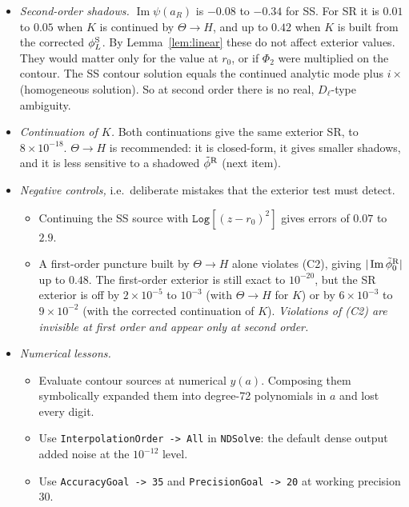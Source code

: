 \documentclass[11pt,a4paper]{article}
\renewcommand{\Im}{\operatorname{Im}}
\newcommand{\phiS}{\phi^{\rm S}}
\newcommand{\code}[1]{\texttt{#1}}
\begin{document}
\begin{itemize}[nosep]
\item \emph{Second-order shadows.}
  $\Im\psi(a_R)$ is $-0.08$ to $-0.34$ for SS.
  For SR it is $0.01$ to $0.05$ when $K$ is continued by $\Theta\to H$, and up to $0.42$ when $K$ is built from the corrected $\phiS_L$.
  By Lemma~\ref{lem:linear} these do not affect exterior values.
  They would matter only for the value at $r_0$, or if $\Phi_2$ were multiplied on the contour.
  The SS contour solution equals the continued analytic mode plus $i\times$(homogeneous solution).
  So at second order there is no real, $D_\ell$-type ambiguity.
\item \emph{Continuation of $K$.}
  Both continuations give the same exterior SR, to $8\times10^{-18}$.
  $\Theta\to H$ is recommended: it is closed-form, it gives smaller shadows, and it is less sensitive to a shadowed $\tilde\phi^{\rm R}$ (next item).
\item \emph{Negative controls,} i.e.\ deliberate mistakes that the exterior test must detect.
  \begin{itemize}[nosep]
  \item Continuing the SS source with $\code{Log}[(z-r_0)^2]$ gives errors of $0.07$ to $2.9$.
  \item A first-order puncture built by $\Theta\to H$ alone violates (C2), giving $|\Im\tilde\phi^{\rm R}_0|$ up to $0.48$.
    The first-order exterior is still exact to $10^{-20}$, but the SR exterior is off by $2\times10^{-5}$ to $10^{-3}$ (with $\Theta\to H$ for $K$) or by $6\times10^{-3}$ to $9\times10^{-2}$ (with the corrected continuation of $K$).
    \emph{Violations of (C2) are invisible at first order and appear only at second order.}
  \end{itemize}
\item \emph{Numerical lessons.}
  \begin{itemize}[nosep]
  \item Evaluate contour sources at numerical $y(a)$. Composing them symbolically expanded them into degree-72 polynomials in $a$ and lost every digit.
  \item Use \code{InterpolationOrder\,->\,All} in \code{NDSolve}: the default dense output added noise at the $10^{-12}$ level.
  \item Use \code{AccuracyGoal\,->\,35} and \code{PrecisionGoal\,->\,20} at working precision 30.
  \end{itemize}
\end{itemize}
\end{document}
